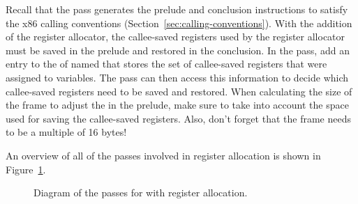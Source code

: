\documentclass[11pt]{book}
\begin{document}
Recall that the  pass generates the prelude and
conclusion instructions to satisfy the x86 calling conventions
(Section~\ref{sec:calling-conventions}). With the addition of the
register allocator, the callee-saved registers used by the register
allocator must be saved in the prelude and restored in the conclusion.
In the  pass, add an entry to the 
of  named  that stores the set of
callee-saved registers that were assigned to variables. The
 pass can then access this information to decide which
callee-saved registers need to be saved and restored.
%
When calculating the size of the frame to adjust the  in the
prelude, make sure to take into account the space used for saving the
callee-saved registers. Also, don't forget that the frame needs to be
a multiple of 16 bytes!

An overview of all of the passes involved in register allocation is
shown in Figure~\ref{fig:reg-alloc-passes}.

\begin{figure}[tbp]
\caption{Diagram of the passes for \LangVar{} with register allocation.}
\label{fig:reg-alloc-passes}
\end{figure}
\end{document}
